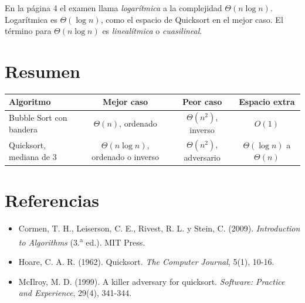 \documentclass[11pt]{article}
\begin{document}
En la página 4 el examen llama \emph{logarítmica} a la complejidad $\Theta(n \log n)$. Logarítmica es $\Theta(\log n)$, como el espacio de Quicksort en el mejor caso. El término para $\Theta(n \log n)$ es \emph{linealítmica} o \emph{cuasilineal}.

\section{Resumen}

\begin{center}
\begin{tabular}{lccc}
\toprule
Algoritmo & Mejor caso & Peor caso & Espacio extra \\
\midrule
Bubble Sort con bandera & $\Theta(n)$, ordenado & $\Theta(n^2)$, inverso & $O(1)$ \\
Quicksort, mediana de 3 & $\Theta(n \log n)$, ordenado o inverso & $\Theta(n^2)$, adversario & $\Theta(\log n)$ a $\Theta(n)$ \\
\bottomrule
\end{tabular}
\end{center}

\section*{Referencias}

\begin{itemize}
\item Cormen, T. H., Leiserson, C. E., Rivest, R. L. y Stein, C. (2009). \emph{Introduction to Algorithms} (3.\textsuperscript{a} ed.). MIT Press.
\item Hoare, C. A. R. (1962). Quicksort. \emph{The Computer Journal}, 5(1), 10-16.
\item McIlroy, M. D. (1999). A killer adversary for quicksort. \emph{Software: Practice and Experience}, 29(4), 341-344.
\end{itemize}
\end{document}
